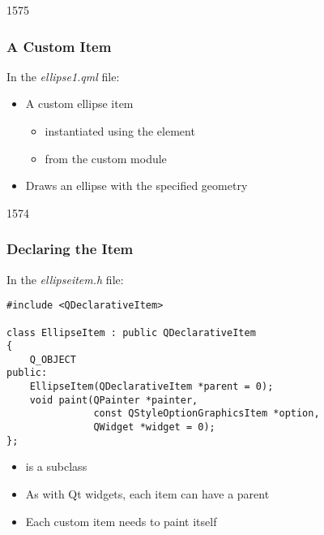 \begin{slide}[fragile]{1575}\frametitle{A Custom Item}

In the \textit{ellipse1.qml} file:

\vspace*{0.5em}

\vspace*{0.5em}
\begin{itemize}
\item A custom ellipse item
  \begin{itemize}
  \item instantiated using the  element
  \item from the custom  module
  \end{itemize}
\item Draws an ellipse with the specified geometry
\end{itemize}

\end{slide}

\begin{slide}[fragile]{1574}\frametitle{Declaring the Item}

In the \textit{ellipseitem.h} file:

\medskip
\begin{lstlisting}
#include <QDeclarativeItem>

class EllipseItem : public QDeclarativeItem
{
    Q_OBJECT
public:
    EllipseItem(QDeclarativeItem *parent = 0);
    void paint(QPainter *painter,
               const QStyleOptionGraphicsItem *option,
               QWidget *widget = 0);
};
\end{lstlisting}

\begin{itemize}
\item {} is a  subclass
\item As with Qt widgets, each item can have a parent
\item Each custom item needs to paint itself
\end{itemize}

\end{slide}

